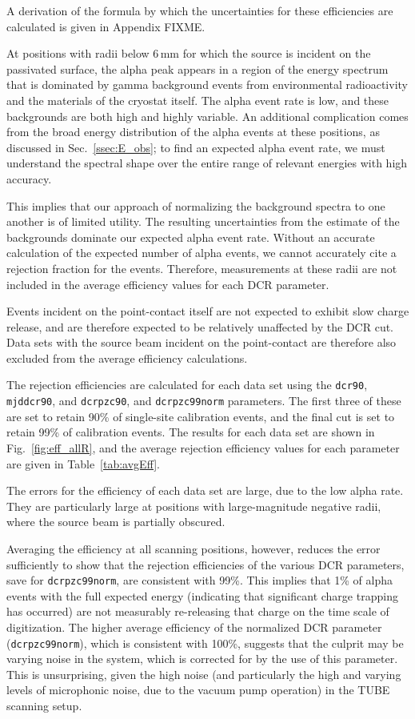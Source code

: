 \documentclass[groupedaddress,rmp,amsmath,amssymb,bibnotes,altaffilletter,twocolumn]{revtex4-1}
\begin{document}
A derivation of the formula by which the uncertainties for these efficiencies are calculated is given in Appendix FIXME. 

At positions with radii below 6\,mm for which the source is incident on the passivated surface, the alpha peak appears in a region of the energy spectrum that is dominated by gamma background events from environmental radioactivity and the materials of the cryostat itself. The alpha event rate is low, and these backgrounds are both high and highly variable. An additional complication comes from the broad energy distribution of the alpha events at these positions, as discussed in Sec.~\ref{ssec:E_obs}; to find an expected alpha event rate, we must understand the spectral shape over the entire range of relevant energies with high accuracy. 

This implies that our approach of normalizing the background spectra to one another is of limited utility.  The resulting uncertainties from the estimate of the backgrounds dominate our expected alpha event rate. Without an accurate calculation of the expected number of alpha events, we cannot accurately cite a rejection fraction for the events. Therefore, measurements at these radii are not included in the average efficiency values for each DCR parameter. 

Events incident on the point-contact itself are not expected to exhibit slow charge release, and are therefore expected to be relatively unaffected by the DCR cut. Data sets with the source beam incident on the point-contact are therefore also excluded from the average efficiency calculations. 

The rejection efficiencies are calculated for each data set using the {\tt dcr90}, {\tt mjddcr90}, and {\tt dcrpzc90}, and {\tt dcrpzc99norm} parameters. The first three of these are set to retain 90\% of single-site calibration events, and the final cut is set to retain 99\% of calibration events. The results for each data set are shown in Fig.~\ref{fig:eff_allR}, and the average rejection efficiency values for each parameter are given in Table~\ref{tab:avgEff}. 

The errors for the efficiency of each data set are large, due to the low alpha rate. They are particularly large at positions with large-magnitude negative radii, where the source beam is partially obscured. 

Averaging the efficiency at all scanning positions, however, reduces the error sufficiently to show that the rejection efficiencies of the various DCR parameters, save for {\tt dcrpzc99norm}, are consistent with 99\%. This implies that 1\% of alpha events with the full expected energy (indicating that significant charge trapping has occurred) are not measurably re-releasing that charge on the time scale of digitization. The higher average efficiency of the normalized DCR parameter ({\tt dcrpzc99norm}), which is consistent with 100\%, suggests that the culprit may be varying noise in the system, which is corrected for by the use of this parameter. This is unsurprising, given the high noise (and particularly the high and varying levels of microphonic noise, due to the vacuum pump operation) in the TUBE scanning setup. 
\end{document}
